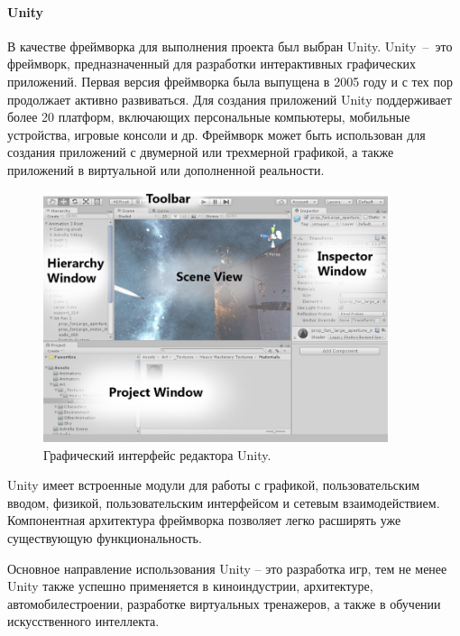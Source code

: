 ﻿\paragraph{Unity}

В качестве фреймворка для выполнения проекта был выбран Unity.
Unity~--~это фреймворк, предназначенный для разработки интерактивных графических приложений.%
\cite{DocUnity}
Первая версия фреймворка была выпущена в 2005 году
и с тех пор продолжает активно развиваться.
Для создания приложений Unity поддерживает более 20 платформ,
включающих персональные компьютеры, мобильные устройства, игровые консоли и др.
Фреймворк может быть использован для создания приложений
с двумерной или трехмерной графикой, а также приложений
в виртуальной или дополненной реальности.

\begin{figure}[!htp]
    \centering
    \includegraphics[width=0.9\textwidth, frame]{images/Unity-interface.jpg}
    \caption{Графический интерфейс редактора Unity.%
    \cite{DocUnity}}
    \label{figure:UnityInterface}
\end{figure}

Unity имеет встроенные модули для работы с
графикой, пользовательским вводом, физикой,
пользовательским интерфейсом и сетевым взаимодействием.
Компонентная архитектура фреймворка позволяет
легко расширять уже существующую функциональность.

Основное направление использования Unity -- это разработка игр,
тем не менее Unity также успешно применяется в киноиндустрии,\cite{UnityInFilmmaking}
архитектуре, автомобилестроении,\cite{UnityInAutomotive}
разработке виртуальных тренажеров, а также в
обучении искусственного интеллекта.\cite{UnityInAI}
